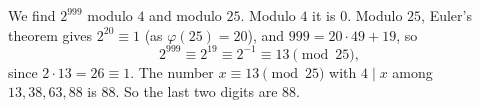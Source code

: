 We find $2^{999}$ modulo $4$ and modulo $25$. Modulo $4$ it is $0$. Modulo $25$, Euler's theorem gives $2^{20}\equiv1$ (as $\varphi(25)=20$), and $999=20\cdot49+19$, so
\[
2^{999}\equiv2^{19}\equiv2^{-1}\equiv13\pmod{25},
\]
since $2\cdot13=26\equiv1$. The number $x\equiv13\pmod{25}$ with $4\mid x$ among $13,38,63,88$ is $88$. So the last two digits are $\boxed{88}$.
